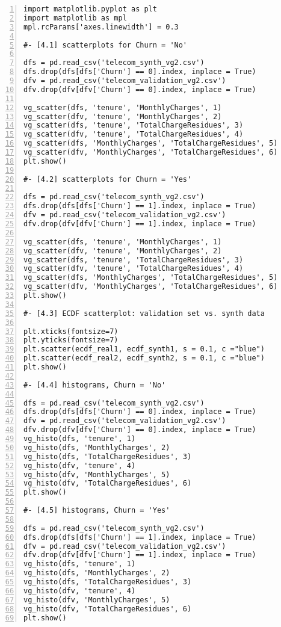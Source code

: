 \documentclass[oneside,10pt]{book}
\begin{document}
\begin{lstlisting}[numbers=left]
import matplotlib.pyplot as plt
import matplotlib as mpl
mpl.rcParams['axes.linewidth'] = 0.3

#- [4.1] scatterplots for Churn = 'No'

dfs = pd.read_csv('telecom_synth_vg2.csv')
dfs.drop(dfs[dfs['Churn'] == 0].index, inplace = True)
dfv = pd.read_csv('telecom_validation_vg2.csv')
dfv.drop(dfv[dfv['Churn'] == 0].index, inplace = True)

vg_scatter(dfs, 'tenure', 'MonthlyCharges', 1)
vg_scatter(dfv, 'tenure', 'MonthlyCharges', 2)
vg_scatter(dfs, 'tenure', 'TotalChargeResidues', 3)
vg_scatter(dfv, 'tenure', 'TotalChargeResidues', 4)
vg_scatter(dfs, 'MonthlyCharges', 'TotalChargeResidues', 5)
vg_scatter(dfv, 'MonthlyCharges', 'TotalChargeResidues', 6)
plt.show()

#- [4.2] scatterplots for Churn = 'Yes'

dfs = pd.read_csv('telecom_synth_vg2.csv')
dfs.drop(dfs[dfs['Churn'] == 1].index, inplace = True)
dfv = pd.read_csv('telecom_validation_vg2.csv')
dfv.drop(dfv[dfv['Churn'] == 1].index, inplace = True)

vg_scatter(dfs, 'tenure', 'MonthlyCharges', 1)
vg_scatter(dfv, 'tenure', 'MonthlyCharges', 2)
vg_scatter(dfs, 'tenure', 'TotalChargeResidues', 3)
vg_scatter(dfv, 'tenure', 'TotalChargeResidues', 4)
vg_scatter(dfs, 'MonthlyCharges', 'TotalChargeResidues', 5)
vg_scatter(dfv, 'MonthlyCharges', 'TotalChargeResidues', 6)
plt.show()

#- [4.3] ECDF scatterplot: validation set vs. synth data 

plt.xticks(fontsize=7)
plt.yticks(fontsize=7)
plt.scatter(ecdf_real1, ecdf_synth1, s = 0.1, c ="blue")
plt.scatter(ecdf_real2, ecdf_synth2, s = 0.1, c ="blue")
plt.show()

#- [4.4] histograms, Churn = 'No'

dfs = pd.read_csv('telecom_synth_vg2.csv')
dfs.drop(dfs[dfs['Churn'] == 0].index, inplace = True)
dfv = pd.read_csv('telecom_validation_vg2.csv')
dfv.drop(dfv[dfv['Churn'] == 0].index, inplace = True)
vg_histo(dfs, 'tenure', 1)
vg_histo(dfs, 'MonthlyCharges', 2)
vg_histo(dfs, 'TotalChargeResidues', 3)
vg_histo(dfv, 'tenure', 4)
vg_histo(dfv, 'MonthlyCharges', 5)
vg_histo(dfv, 'TotalChargeResidues', 6)
plt.show()

#- [4.5] histograms, Churn = 'Yes'

dfs = pd.read_csv('telecom_synth_vg2.csv')
dfs.drop(dfs[dfs['Churn'] == 1].index, inplace = True)
dfv = pd.read_csv('telecom_validation_vg2.csv')
dfv.drop(dfv[dfv['Churn'] == 1].index, inplace = True)
vg_histo(dfs, 'tenure', 1)
vg_histo(dfs, 'MonthlyCharges', 2)
vg_histo(dfs, 'TotalChargeResidues', 3)
vg_histo(dfv, 'tenure', 4)
vg_histo(dfv, 'MonthlyCharges', 5)
vg_histo(dfv, 'TotalChargeResidues', 6)
plt.show()
\end{lstlisting}
\end{document}
